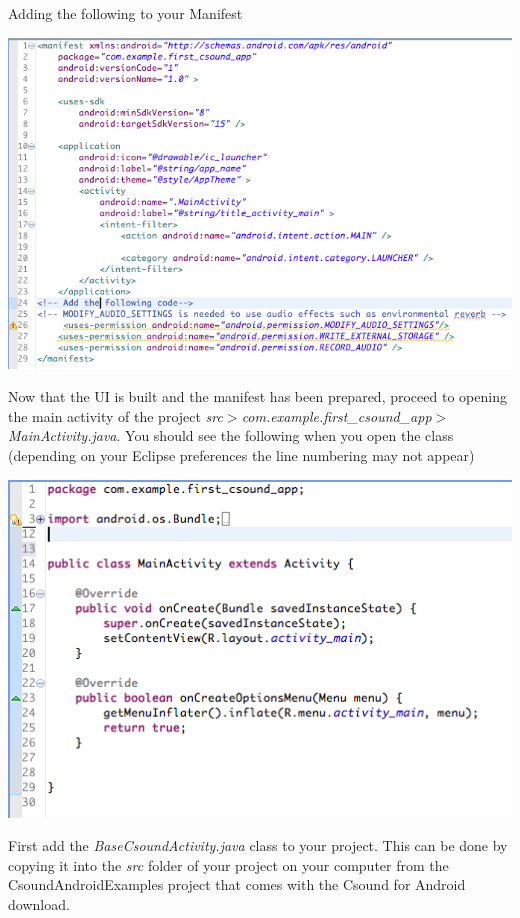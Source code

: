 \documentclass[11pt]{article}
\begin{document}
Adding the following to your Manifest

\begin{center}
\includegraphics[scale=0.60]{images/Manifest}
\end{center}

Now that the UI is built and the manifest has been prepared, proceed to opening the main activity of the project \textit{src}$>$\textit{com.example.first_csound_app}$>$\textit{MainActivity.java}. You should see the following when you open the class (depending on your Eclipse preferences the line numbering may not appear)
\begin{center}
\includegraphics[scale=0.75]{images/CsoundBasicAppOrignalActivity}
\end{center}

First add the \textit{BaseCsoundActivity.java} class to your project. This can be done by copying it into the \textit{src} folder of your project on your computer from the CsoundAndroidExamples project that comes with the Csound for Android download.
\end{document}
